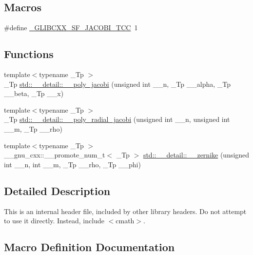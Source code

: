 \subsection*{Macros}
\begin{DoxyCompactItemize}
\item 
\#define \hyperlink{sf__jacobi_8tcc_a5aaa350a13d7d5da211f2b2bbdd648bb}{\+\_\+\+G\+L\+I\+B\+C\+X\+X\+\_\+\+S\+F\+\_\+\+J\+A\+C\+O\+B\+I\+\_\+\+T\+C\+C}~1
\end{DoxyCompactItemize}
\subsection*{Functions}
\begin{DoxyCompactItemize}
\item 
{\footnotesize template$<$typename \+\_\+\+Tp $>$ }\\\+\_\+\+Tp \hyperlink{namespacestd_1_1____detail_a7fcc47c397903ac177380517e94153c6}{std\+::\+\_\+\+\_\+detail\+::\+\_\+\+\_\+poly\+\_\+jacobi} (unsigned int \+\_\+\+\_\+n, \+\_\+\+Tp \+\_\+\+\_\+alpha, \+\_\+\+Tp \+\_\+\+\_\+beta, \+\_\+\+Tp \+\_\+\+\_\+x)
\item 
{\footnotesize template$<$typename \+\_\+\+Tp $>$ }\\\+\_\+\+Tp \hyperlink{namespacestd_1_1____detail_af325d47042bc9661bbde61b13f368fec}{std\+::\+\_\+\+\_\+detail\+::\+\_\+\+\_\+poly\+\_\+radial\+\_\+jacobi} (unsigned int \+\_\+\+\_\+n, unsigned int \+\_\+\+\_\+m, \+\_\+\+Tp \+\_\+\+\_\+rho)
\item 
{\footnotesize template$<$typename \+\_\+\+Tp $>$ }\\\+\_\+\+\_\+gnu\+\_\+cxx\+::\+\_\+\+\_\+promote\+\_\+num\+\_\+t$<$ \+\_\+\+Tp $>$ \hyperlink{namespacestd_1_1____detail_aa7d33201bdf73b58250d6a7ede44e896}{std\+::\+\_\+\+\_\+detail\+::\+\_\+\+\_\+zernike} (unsigned int \+\_\+\+\_\+n, int \+\_\+\+\_\+m, \+\_\+\+Tp \+\_\+\+\_\+rho, \+\_\+\+Tp \+\_\+\+\_\+phi)
\end{DoxyCompactItemize}


\subsection{Detailed Description}
This is an internal header file, included by other library headers. Do not attempt to use it directly. Instead, include $<$cmath$>$. 

\subsection{Macro Definition Documentation}
\hypertarget{sf__jacobi_8tcc_a5aaa350a13d7d5da211f2b2bbdd648bb}{}

